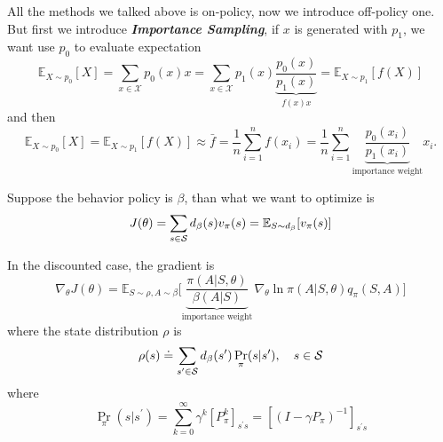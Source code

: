 \documentclass[10pt]{elegantbook}
\newcommand{\mydefination}[1]{\textbf{\textit{\textcolor{structurecolor}{#1}}}}
\begin{document}
All the methods we talked above is on-policy, now we introduce off-policy one. But first we introduce \mydefination{Importance Sampling},
if $x$ is generated with $p_1$, we want use $p_0$ to evaluate expectation
\begin{equation}
    \mathbb{E}_{X\sim p_{0}}[X]=\sum_{x\in{\mathcal{X}}}p_{0}(x)x
    =\sum_{x\in{\mathcal{X}}}p_{1}(x) \underbrace{\frac{p_{0}(x)}{p_{1}(x)}}_{f(x)x}=\mathbb{E}_{X\sim p_{1}}[f(X)]
\end{equation}
and then
\begin{equation}
    \mathbb{E}_{X{\sim}p_{0}}[X]
    =\mathbb{E}_{X{\sim}p_{1}}[f(X)]\approx{\bar{f}}
    ={\frac{1}{n}}\sum_{i=1}^{n}f(x_{i})
    ={\frac{1}{n}}\sum_{i=1}^{n} \underbrace{\frac{p_0(x_i)}{p_1(x_i)}}_{\text{importance weight}} x_{i}.
\end{equation}

Suppose the behavior policy is $\beta$, than what we want to optimize is
\[
    J(\theta)=\sum_{s\in{\cal S}}d_{\beta}(s)v_{\pi}(s)=\mathbb{E}_{S \sim d_{\beta}}[v_{\pi}(s)]
\]

\begin{theorem}
    In the discounted case, the gradient is
    \begin{equation}
        \nabla_{\theta}J(\theta)=
        \mathbb{E}_{S\sim\rho,A\sim\beta}{\Bigg[}
        \underbrace{\frac{\pi(A|S,\theta)}{\beta(A|S)}}_{\text{importance weight}}\,\nabla_{\theta}\ln\pi(A|S,\theta)q_{\pi}(S,A){\Bigg]}
    \end{equation}
    where the state distribution $\rho$ is
    \[
        \rho(s)\doteq\sum_{s^{\prime}\in{\cal S}}d_{\beta}(s^{\prime})\Pr_{\pi}(s|s^{\prime}),\quad s\in\cal{S}
    \]
    where
    \[
        \Pr_{\pi}(s|s^{\prime})=\sum_{k=0}^{\infty}\gamma^{k}[P_{\pi}^{k}]_{s^{\prime}s}=[(I-\gamma P_{\pi})^{-1}]_{s^{\prime}s}
    \]
\end{theorem}
\end{document}
